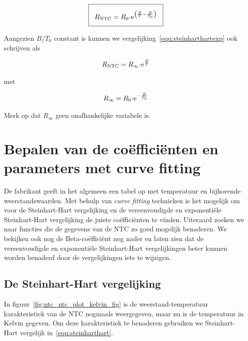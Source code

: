 \documentclass[12pt,a4paper,final,twoside,fleqn]{article}
\let\oldcdot\cdot
\renewcommand{\cdot}{\kern-.10em\oldcdot\kern-.10em}
\begin{document}
\begin{equation}
\label{equ:steinharthartexp}
\setlength\fboxsep{2ex}
\boxed{R_\text{NTC} = R_0\cdot\text{e}^{\left(\frac{B}{T}-\frac{B}{T_0}\right)}}
\end{equation}

Aangezien $B/T_0$ constant is kunnen we vergelijking~\eqref{equ:steinharthartexp}
ook schrijven als

\begin{equation}
\label{equ:betafuncexp}
R_\text{NTC} = R_\infty \cdot\text{e}^\frac{B}{T}
\end{equation}

met

\begin{equation}
R_\infty = R_0\cdot \text{e}^{-\frac{B}{T_0}}
\end{equation}

Merk op dat $R_\infty$ geen onafhankelijke variabele is.


\clearpage
\section{Bepalen van de co\"effici\"enten en parameters met curve fitting}
De fabrikant geeft in het algemeen een tabel op met temperatuur en bijhorende
weerstandswaarden. Met behulp van \textsl{curve fitting} technieken is het
mogelijk om voor de Steinhart-Hart vergelijking en de vereenvoudigde en 
exponenti\"ele Steinhart-Hart vergelijking de juiste co\"effici\"enten te
vinden. Uiteraard zoeken we naar functies die de gegevens van de NTC zo goed
mogelijk benaderen. We bekijken ook nog de Beta-co\"effici\"ent nog nader
en laten zien dat de vereenvoudigde en exponenti\"ele Steinhart-Hart
vergelijkingen beter kunnen worden benaderd door de vergelijkingen iets te
wijzigen.

\subsection{De Steinhart-Hart vergelijking}
In figuur~\ref{fig:ntc_ntc_plot_kelvin_fig} is de weerstand-temperatuur karakteristiek
van de NTC nogmaals weergegeven, maar nu is de temperatuur in Kelvin gegeven. Om
deze karakteristiek te benaderen gebruiken we Steinhart-Hart vergelijk in~\eqref{equ:steinharthart}.
\end{document}
